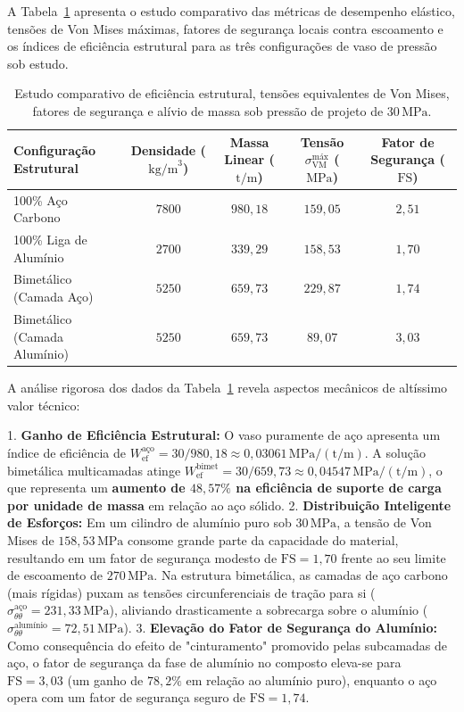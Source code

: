 A Tabela~\ref{tab:comparativo_eficiencia} apresenta o estudo comparativo das métricas de desempenho elástico, tensões de Von Mises máximas, fatores de segurança locais contra escoamento e os índices de eficiência estrutural para as três configurações de vaso de pressão sob estudo.

\begin{table}[htbp]
  \centering
  \caption{Estudo comparativo de eficiência estrutural, tensões equivalentes de Von Mises, fatores de segurança e alívio de massa sob pressão de projeto de $30 \, \text{MPa}$.}
  \label{tab:comparativo_eficiencia}
  \begin{tabular}{|l|c|c|c|c|}
    \hline
    \textbf{Configuração Estrutural} & \textbf{Densidade ($\text{kg/m}^3$)} & \textbf{Massa Linear ($\text{t/m}$)} & \textbf{Tensão $\sigma_{\text{VM}}^{\text{máx}}$ ($\text{MPa}$)} & \textbf{Fator de Segurança ($\text{FS}$)} \\ \hline
    100\% Aço Carbono & $7800$ & $980,18$ & $159,05$ & $2,51$ \\ \hline
    100\% Liga de Alumínio & $2700$ & $339,29$ & $158,53$ & $1,70$ \\ \hline
    Bimetálico (Camada Aço) & $5250$ & $659,73$ & $229,87$ & $1,74$ \\ \hline
    Bimetálico (Camada Alumínio) & $5250$ & $659,73$ & $89,07$ & $3,03$ \\ \hline
  \end{tabular}
\end{table}

A análise rigorosa dos dados da Tabela~\ref{tab:comparativo_eficiencia} revela aspectos mecânicos de altíssimo valor técnico:

1. \textbf{Ganho de Eficiência Estrutural:} O vaso puramente de aço apresenta um índice de eficiência de $W_{\text{ef}}^{\text{aço}} = 30 / 980,18 \approx 0,03061 \, \text{MPa}/(\text{t/m})$. A solução bimetálica multicamadas atinge $W_{\text{ef}}^{\text{bimet}} = 30 / 659,73 \approx 0,04547 \, \text{MPa}/(\text{t/m})$, o que representa um \textbf{aumento de $48,57\%$ na eficiência de suporte de carga por unidade de massa} em relação ao aço sólido.
2. \textbf{Distribuição Inteligente de Esforços:} Em um cilindro de alumínio puro sob $30 \, \text{MPa}$, a tensão de Von Mises de $158,53 \, \text{MPa}$ consome grande parte da capacidade do material, resultando em um fator de segurança modesto de $\text{FS} = 1,70$ frente ao seu limite de escoamento de $270 \, \text{MPa}$. Na estrutura bimetálica, as camadas de aço carbono (mais rígidas) puxam as tensões circunferenciais de tração para si ($\sigma_{\theta\theta}^{\text{aço}} = 231,33 \, \text{MPa}$), aliviando drasticamente a sobrecarga sobre o alumínio ($\sigma_{\theta\theta}^{\text{alumínio}} = 72,51 \, \text{MPa}$).
3. \textbf{Elevação do Fator de Segurança do Alumínio:} Como consequência do efeito de "cinturamento" promovido pelas subcamadas de aço, o fator de segurança da fase de alumínio no composto eleva-se para \textbf{$\text{FS} = 3,03$} (um ganho de $78,2\%$ em relação ao alumínio puro), enquanto o aço opera com um fator de segurança seguro de $\text{FS} = 1,74$.

